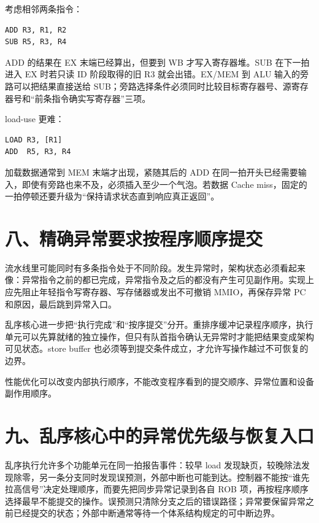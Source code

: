 考虑相邻两条指令：

\begin{lstlisting}
ADD R3, R1, R2
SUB R5, R3, R4
\end{lstlisting}

ADD 的结果在 EX 末端已经算出，但要到 WB 才写入寄存器堆。SUB 在下一拍进入 EX 时若只读 ID 阶段取得的旧 R3 就会出错。EX/MEM 到 ALU 输入的旁路可以把结果直接送给 SUB；旁路选择条件必须同时比较目标寄存器号、源寄存器号和“前条指令确实写寄存器”三项。

load-use 更难：

\begin{lstlisting}
LOAD R3, [R1]
ADD  R5, R3, R4
\end{lstlisting}

加载数据通常到 MEM 末端才出现，紧随其后的 ADD 在同一拍开头已经需要输入，即使有旁路也来不及，必须插入至少一个气泡。若数据 Cache miss，固定的一拍停顿还要升级为“保持请求状态直到响应真正返回”。

\section{八、精确异常要求按程序顺序提交}

流水线里可能同时有多条指令处于不同阶段。发生异常时，架构状态必须看起来像：异常指令之前的都已完成，异常指令及之后的都没有产生可见副作用。实现上应先阻止年轻指令写寄存器、写存储器或发出不可撤销 MMIO，再保存异常 PC 和原因，最后跳到异常入口。

乱序核心进一步把“执行完成”和“按序提交”分开。重排序缓冲记录程序顺序，执行单元可以先算就绪的独立操作，但只有队首指令确认无异常时才能把结果变成架构可见状态。store buffer 也必须等到提交条件成立，才允许写操作越过不可恢复的边界。

\begin{keyidea}
性能优化可以改变内部执行顺序，不能改变程序看到的提交顺序、异常位置和设备副作用顺序。
\end{keyidea}
\section{九、乱序核心中的异常优先级与恢复入口}

乱序执行允许多个功能单元在同一拍报告事件：较早 load 发现缺页，较晚除法发现除零，另一条分支同时发现误预测，外部中断也可能到达。控制器不能按“谁先拉高信号”决定处理顺序，而要先把同步异常记录到各自 ROB 项，再按程序顺序选择最早不能提交的操作。误预测只清除分支之后的错误路径；异常要保留异常之前已经提交的状态；外部中断通常等待一个体系结构规定的可中断边界。

